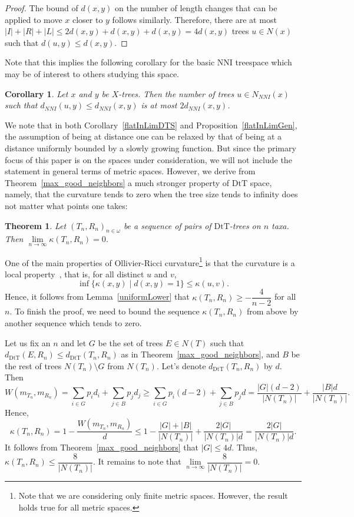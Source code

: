 \documentclass{amsart}
\newtheorem{corollary}[lemma]{Corollary}
\newtheorem{theorem}[lemma]{Theorem}
\newcommand{\dts}{\mathrm{DtT}}
\begin{document}
\begin{proof}
The bound of $d(x,y)$ on the number of length changes that can be applied to move $x$ closer to $y$ follows similarly.
Therefore, there are at most $|I| + |R| + |L| \le 2d(x,y) + d(x,y) + d(x,y) = 4d(x,y)$ trees $u \in N(x)$ such that $d(u, y) \le d(x, y)$. 
\end{proof}

Note that this implies the following corollary for the basic NNI treespace which may be of interest to others studying this space. 
\begin{corollary}
Let $x$ and $y$ be $X$-trees.
Then the number of trees $u \in N_{NNI}(x)$ such that $d_{NNI}(u, y) \le d_{NNI}(x, y)$ is at most $2d_{NNI}(x,y)$.
\end{corollary}

We note that in both Corollary~\ref{flatInLimDTS} and Proposition~\ref{flatInLimGen}, the assumption of being at distance one can be relaxed by that of being at a distance uniformly bounded by a slowly growing function.
But since the primary focus of this paper is on the spaces under consideration, we will not  include the statement in general terms of metric spaces. 
However, we derive from Theorem~\ref{max_good_neighbors} a much stronger property of $\dts$ space, namely, that the curvature tends to zero when the tree size tends to infinity does not matter what points one takes:

\begin{theorem}
Let $(T_n,R_n)_{n\in\omega}$ be a sequence of pairs of $\dts$-trees on $n$ taxa.
Then $\lim\limits_{n \to \infty}\kappa(T_n,R_n) = 0$.
\end{theorem}

\proof
One of the main properties of Ollivier-Ricci curvature\footnote{Note that we are considering only finite metric spaces. 
However, the result holds true for all metric spaces.} 
is that the curvature is a local property~\cite{Ollivier2009-cj}, that is, for all distinct $u$ and $v$,
\[
\inf\{\kappa(x,y)\mid d(x,y) = 1\} \leq \kappa(u,v).
\]
Hence, it follows from Lemma~\ref{uniformLower} that $\kappa(T_n,R_n) \geq -\dfrac{4}{n-2}$ for all $n$. 
To finish the proof, we need to bound the sequence $\kappa(T_n,R_n)$ from above by another sequence which tends to zero. 

Let us fix an $n$ and let $G$ be the set of trees $E \in N(T)$ such that $d_\dts(E,R_n) \leq d_\dts(T_n,R_n)$ as in Theorem~\ref{max_good_neighbors}, and $B$ be the rest of trees $N(T_n)\setminus G$ from $N(T_n)$. 
Let's denote $d_\dts(T_n,R_n)$ by $d$. Then 
\[
W(m_{T_n},m_{R_n}) = \sum_{i\in G} p_i d_i + \sum_{j\in B} p_j d_j \geq
\sum_{i\in G} p_i (d-2) + \sum_{j\in B} p_j d = 
\frac{|G|(d-2)}{|N(T_n)|} + \frac{|B|d}{|N(T_n)|}.
\]
Hence,
\[
\kappa(T_n,R_n) = 1 - \frac{W(m_{T_n},m_{R_n})}{d} \leq
1 - \frac{|G| + |B|}{|N(T_n)|} + \frac{2|G|}{|N(T_n)|d} 
= \frac{2|G|}{|N(T_n)|d}.
\]
It follows from Theorem~\ref{max_good_neighbors} that $|G| \leq 4d$. 
Thus, $\kappa(T_n,R_n) \leq \dfrac{8}{|N(T_n)|}$. 
It remains to note that $\lim\limits_{n\to\infty}\dfrac{8}{|N(T_n)|} = 0$. 
\endproof
\end{document}
